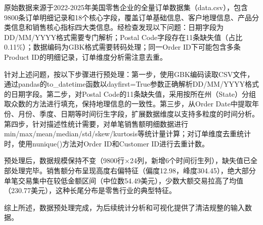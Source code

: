 原始数据来源于2022-2025年美国零售企业的全量订单数据集（data.csv），包含9800条订单明细记录和18个核心字段，覆盖订单基础信息、客户地理信息、产品分类信息和销售核心指标四大类信息。经检查发现以下问题：日期字段为DD/MM/YYYY格式需要专门解析；Postal Code字段存在11条缺失值（占比0.11\%）；数据编码为GBK格式需要转码处理；同一Order ID下可能包含多条Product ID的明细记录，订单维度分析需注意去重。

针对上述问题，按以下步骤进行预处理：第一步，使用GBK编码读取CSV文件，通过pandas的to\_datetime函数以dayfirst=True参数正确解析DD/MM/YYYY格式的日期字段。第二步，对Postal Code的11条缺失值，采用按所在州（State）分组取众数的方法进行填充，保持地理信息的一致性。第三步，从Order Date中提取年份、月份、季度、日期等时间衍生字段，扩展数据维度以支持多粒度的时间分析。第四步，针对描述性统计需要，对单笔销售额明细数据进行min/max/mean/median/std/skew/kurtosis等统计量计算；对订单维度去重统计时，使用nunique()方法对Order ID和Customer ID进行去重计数。

预处理后，数据规模保持不变（9800行×24列，新增6个时间衍生列），缺失值已全部处理完毕。销售额分布呈现高度右偏特征（偏度12.98，峰度304.45），绝大部分单笔交易集中在较低金额区间（中位数54.49美元），少数大额交易拉高了均值（230.77美元），这种长尾分布是零售行业的典型特征。

综上所述，数据预处理完成，为后续统计分析和可视化提供了清洁规整的输入数据。
